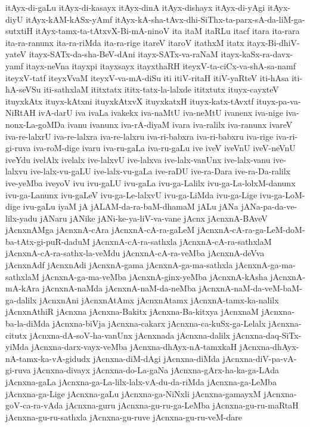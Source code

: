 {itAyx-di-gaLu
itAyx-di-kasayx
itAyx-dinA
itAyx-dishayx
itAyx-di-yAgi
itAyx-diyU
itAyx-kAM-kASx-yAmf
itAyx-kA-sha-tAvx-dhi-SiThx-ta-parx-sA-da-liM-ga-sutxtiH
itAyx-tamx-ta-tAtxvX-Bi-mA-ninoV
ita
itaM
itaRLu
itacf
itara
ita-rara
ita-ra-ranunx
ita-ra-riMda
ita-ra-rige
itareV
itaroV
itathxM
itatx
itayx-Bi-dhiV-yateV
itayx-SATx-da-sha-BeV-dAni
itayx-SATx-va-raNaM
itayx-kaSx-ra-davx-yamf
itayx-neVna
itayxpi
itayxsayx
itayxthaRH
iteyxV-ta-ciCx-va-shA-sa-namf
iteyxV-tatf
iteyxVvaM
iteyxV-va-mA-diSu
iti
itiV-ritaH
itiV-yaRteV
iti-hAsa
iti-hA-seVSu
iti-sathxlaM
ititxtatx
ititx-tatx-la-lalxde
ititxtutx
ituyx-cayxteV
ituyxkAtx
ituyx-kAtxni
ituyxkAtxvX
ituyxkatxH
ituyx-katx-tAvxtf
ituyx-pa-va-NiRtAH
ivA-darU
iva
ivaLa
ivakekx
iva-naMtU
iva-neMtU
ivanenx
iva-nige
iva-nonx-La-goMDa
ivanu
ivanunx
iva-rA-diyaM
ivara
iva-ralilx
iva-ranunx
ivareV
iva-re-lalxrU
iva-re-lalxra
iva-re-lalxru
iva-ri-babxra
iva-ri-babxru
iva-rige
iva-ri-gi-ruva
iva-roM-dige
ivaru
iva-ru-gaLa
iva-ru-gaLu
ive
iveV
iveVnU
iveV-neVnU
iveYdu
ivelAlx
ivelalx
ive-lalxvU
ive-lalxva
ive-lalx-vanUnx
ive-lalx-vanu
ive-lalxvu
ive-lalx-vu-gaLU
ive-lalx-vu-gaLa
ive-raDU
ive-ra-Dara
ive-ra-Da-ralilx
ive-yeMba
iveyoV
ivu
ivu-gaLU
ivu-gaLa
ivu-ga-Lalilx
ivu-ga-La-lolxM-danunx
ivu-ga-Lanunx
ivu-gaLeV
ivu-ga-Le-lalxvU
ivu-ga-LiMda
ivu-ga-Lige
ivu-ga-LoM-dige
ivu-gaLu
iyaM
jA
jALAM-da-ra-baM-dhamaM
jALu
jANa
jANa-pa-da-ve-lilx-yadu
jANaru
jANike
jANi-ke-ya-liV-va-vane
jAcnx
jAcnxnA-BAveV
jAcnxnAMga
jAcnxnA-cAra
jAcnxnA-cA-ra-gaLeM
jAcnxnA-cA-ra-ga-LeM-doM-ba-tAtx-gi-puR-daduM
jAcnxnA-cA-ra-sathxla
jAcnxnA-cA-ra-sathxlaM
jAcnxnA-cA-ra-sathx-la-veMdu
jAcnxnA-cA-ra-veMba
jAcnxnA-deVva
jAcnxnAdf
jAcnxnAdi
jAcnxnA-gama
jAcnxnA-ga-ma-sathxla
jAcnxnA-ga-ma-sathxlaM
jAcnxnA-ga-ma-veMba
jAcnxnA-ginx-yeMba
jAcnxnA-kAsha
jAcnxnA-mA-kAra
jAcnxnA-naMda
jAcnxnA-naM-da-neMba
jAcnxnA-naM-da-veM-baM-ga-dalilx
jAcnxnAni
jAcnxnAtAmx
jAcnxnAtamx
jAcnxnA-tamx-ka-nalilx
jAcnxnAthiR
jAcnxna
jAcnxna-Bakitx
jAcnxna-Ba-kitxya
jAcnxnaM
jAcnxna-ba-la-diMda
jAcnxna-biVja
jAcnxna-cakarx
jAcnxna-ca-kuSx-ga-Lelalx
jAcnxna-citutx
jAcnxna-dA-soV-ha-vanUnx
jAcnxnada
jAcnxna-dalilx
jAcnxna-daq-SiTx-yiMda
jAcnxna-darx-vayx-veMba
jAcnxna-dhAyx-nA-tamxkaH
jAcnxna-dhAyx-nA-tamx-ka-vA-gidudx
jAcnxna-diM-dAgi
jAcnxna-diMda
jAcnxna-diV-pa-vA-gi-ruva
jAcnxna-divayx
jAcnxna-do-La-gaNa
jAcnxna-gArx-ha-ka-ga-LAda
jAcnxna-gaLa
jAcnxna-ga-La-lilx-lalx-vA-du-da-riMda
jAcnxna-ga-LeMba
jAcnxna-ga-Lige
jAcnxna-gaLu
jAcnxna-ga-NiNxli
jAcnxna-gamayxM
jAcnxna-goV-ca-ra-vAda
jAcnxna-guru
jAcnxna-gu-ru-ga-LeMba
jAcnxna-gu-ru-maRtaH
jAcnxna-gu-ru-sathxla
jAcnxna-gu-ruve
jAcnxna-gu-ru-veM-dare
}
